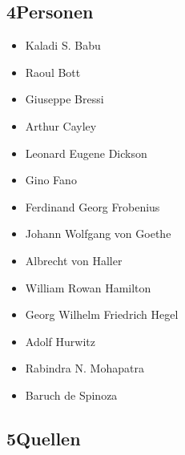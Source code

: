\documentclass[11pt,a4paper]{article}
\begin{document}
\subsection*{4\quad Personen}

\begin{itemize}[leftmargin=1.2em,itemsep=0pt]
\item Kaladi S. Babu
\item Raoul Bott
\item Giuseppe Bressi
\item Arthur Cayley
\item Leonard Eugene Dickson
\item Gino Fano
\item Ferdinand Georg Frobenius
\item Johann Wolfgang von Goethe
\item Albrecht von Haller
\item William Rowan Hamilton
\item Georg Wilhelm Friedrich Hegel
\item Adolf Hurwitz
\item Rabindra N. Mohapatra
\item Baruch de Spinoza
\end{itemize}

\subsection*{5\quad Quellen}
\end{document}
